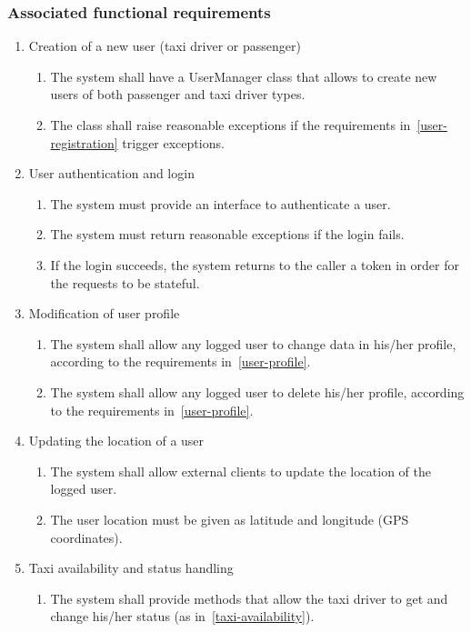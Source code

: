 \subsubsection{Associated functional requirements}
\begin{enumerate}
\item Creation of a new user (taxi driver or passenger)
\begin{enumerate}
    \item The system shall have a UserManager class that allows to create new users of both passenger and taxi driver types.
    \item The class shall raise reasonable exceptions if the requirements in~\autoref{user-registration} trigger exceptions.
\end{enumerate}
\item User authentication and login
\begin{enumerate}
    \item The system must provide an interface to authenticate a user.
    \item The system must return reasonable exceptions if the login fails.
    \item If the login succeeds, the system returns to the caller a token in order for the requests to be stateful.
\end{enumerate}
\item Modification of user profile
\begin{enumerate}
    \item The system shall allow any logged user to change data in his/her profile, according to the requirements in~\autoref{user-profile}.
    \item The system shall allow any logged user to delete his/her profile, according to the requirements in~\autoref{user-profile}.
\end{enumerate}
\item Updating the location of a user
\begin{enumerate}
    \item The system shall allow external clients to update the location of the logged user.
    \item The user location must be given as latitude and longitude (GPS coordinates).
\end{enumerate}
\item Taxi availability and status handling
\begin{enumerate}
    \item The system shall provide methods that allow the taxi driver to get and change his/her status (as in~\autoref{taxi-availability}).

\end{enumerate}
\end{enumerate}
